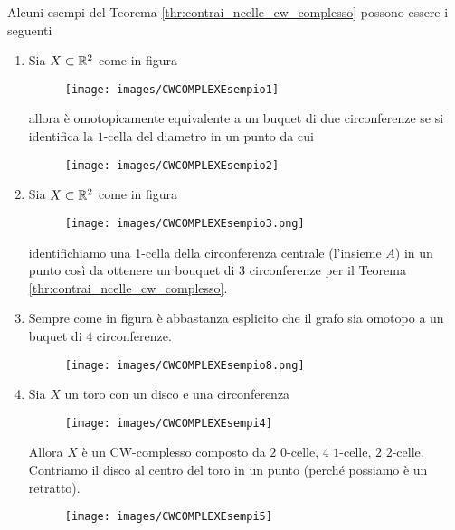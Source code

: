 \begin{remark}
	Alcuni esempi del Teorema \ref{thr:contrai_ncelle_cw_complesso} possono essere i seguenti
	\begin{enumerate}
		\item Sia $X \subset \mathbb{R}^2$ come in figura 
		\begin{figure}[h]
			\centering
			\texttt{[image: images/CWCOMPLEXEsempio1]}
			\caption{}
			\label{fig:cwcomplexesempio1}
		\end{figure}
		allora è omotopicamente equivalente a un buquet di due circonferenze se si identifica la $1$-cella del diametro in un punto da cui
		\begin{figure}[h]
			\centering
			\texttt{[image: images/CWCOMPLEXEsempio2]}
			\caption{}
			\label{fig:cwcomplexesempio2}
		\end{figure}
		\item Sia $X \subset \mathbb{R}^2$ come in figura 
			\begin{figure}[h]
				\centering
				\texttt{[image: images/CWCOMPLEXEsempio3.png]}
				\caption{}
				\label{fig:cwcomplexesempio3}
			\end{figure}
			identifichiamo una 1-cella della circonferenza centrale (l'insieme $A$) in un punto così da ottenere un bouquet di $3$ circonferenze per il Teorema \ref{thr:contrai_ncelle_cw_complesso}.   
		\item Sempre come in figura è abbastanza esplicito  che il grafo sia omotopo a un buquet di $4$ circonferenze.
			\begin{figure}[h]
				\centering
				\texttt{[image: images/CWCOMPLEXEsempio8.png]}
				\caption{}
				\label{fig:cwcomplexesempi4}
			\end{figure}
		\item Sia $X$ un toro con un disco e una circonferenza 
			\begin{figure}[h!]
				\centering
				\texttt{[image: images/CWCOMPLEXEsempi4]}
				\caption{}
				\label{fig:cwcomplexesempi4}
			\end{figure}
			Allora $X$ è un CW-complesso composto da $2$ $0$-celle, $4$ $1$-celle, $2$ $2$-celle. Contriamo il disco al centro del toro in un punto (perché possiamo è un retratto).   
			\begin{figure}[h!]
				\centering
				\texttt{[image: images/CWCOMPLEXEsempi5]}
				\caption{}
				\label{fig:cwcomplexesempi4}
			\end{figure}

\end{enumerate}
\end{remark}
